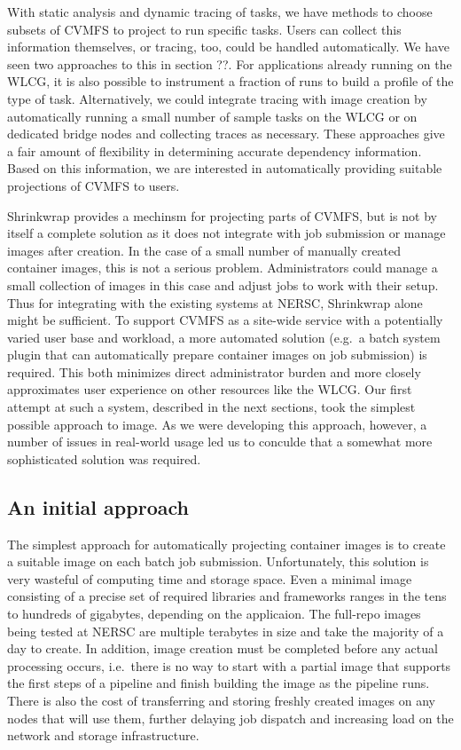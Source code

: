 \documentclass[sigconf]{acmart}
\begin{document}
With static analysis and dynamic tracing of tasks,
we have methods to choose subsets of CVMFS to project to run specific tasks.
Users can collect this information themselves,
or tracing, too, could be handled automatically.
We have seen two approaches to this in section ??.
For applications already running on the WLCG,
it is also possible to instrument a fraction of runs to build a profile of the type of task.
Alternatively, we could integrate tracing with image creation by automatically running a small number of sample tasks on the WLCG or on dedicated bridge nodes and collecting traces as necessary.
These approaches give a fair amount of flexibility in determining accurate dependency information.
Based on this information,
we are interested in automatically providing suitable projections of CVMFS to users.

Shrinkwrap provides a mechinsm for projecting parts of CVMFS,
but is not by itself a complete solution as it does not integrate with job submission or manage images after creation.
In the case of a small number of manually created container images,
this is not a serious problem.
Administrators could manage a small collection of images in this case and adjust jobs to work with their setup.
Thus for integrating with the existing systems at NERSC,
Shrinkwrap alone might be sufficient.
To support CVMFS as a site-wide service with a potentially varied user base and workload,
a more automated solution
(e.g.\ a batch system plugin that can automatically prepare container images on job submission)
is required.
This both minimizes direct administrator burden and more closely approximates user experience on other resources like the WLCG.
Our first attempt at such a system,
described in the next sections,
took the simplest possible approach to image.
As we were developing this approach, however,
a number of issues in real-world usage led us to conculde that a somewhat more sophisticated solution was required.

\subsection{An initial approach}

The simplest approach for automatically projecting container images is to create a suitable image on each batch job submission.
Unfortunately, this solution is very wasteful of computing time and storage space.
Even a minimal image consisting of a precise set of required libraries and frameworks ranges in the tens to hundreds of gigabytes,
depending on the applicaion.
The full-repo images being tested at NERSC are multiple terabytes in size and take the majority of a day to create.
In addition, image creation must be completed before any actual processing occurs,
i.e.\ there is no way to start with a partial image that supports the first steps of a pipeline and finish building the image as the pipeline runs.
There is also the cost of transferring and storing freshly created images on any nodes that will use them,
further delaying job dispatch and increasing load on the network and storage infrastructure.
\end{document}
